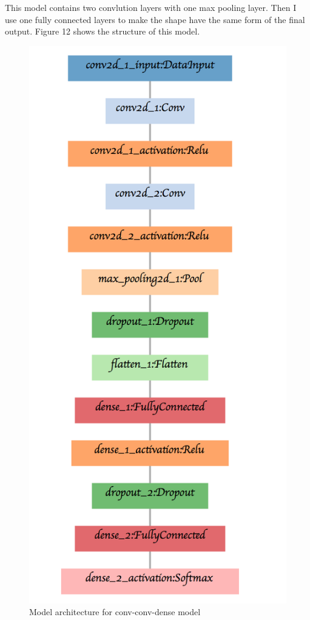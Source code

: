 \documentclass{article}
\begin{document}
This model contains two convlution layers with one max pooling layer. Then I use one fully connected layers to make the shape have the same form of the final output. Figure 12 shows the structure of this model.

\begin{figure}[htbp]
    \centering
    \includegraphics[scale = 0.5]{model_3.png}
    \caption{Model architecture for conv-conv-dense model}
    \label{fig12}
\end{figure}
\end{document}
